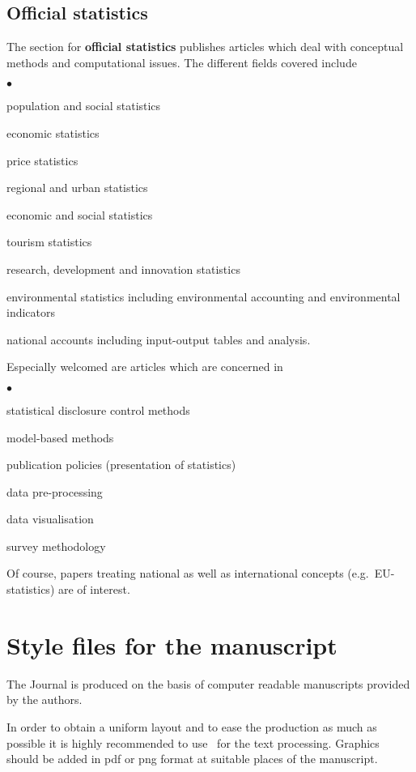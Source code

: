 \documentclass[article]{ajs}
\begin{document}
\subsection{Official statistics}

The section for {\bf official statistics} publishes articles which
deal with conceptual methods and computational issues. The
different fields covered include
\begin{list}{$\bullet$}{\setlength{\topsep}{0mm}\setlength{\itemsep}{-1mm}}
 \item population and social statistics
 \item economic statistics
 \item price statistics
 \item regional and urban statistics
 \item economic and social statistics
 \item tourism statistics
 \item research, development and innovation statistics
 \item environmental statistics including environmental accounting and
       environmental indicators
 \item national accounts including input-output tables and analysis.
\end{list}
Especially welcomed are articles which are concerned in
\begin{list}{$\bullet$}{\setlength{\topsep}{0mm}\setlength{\itemsep}{-1mm}}
 \item statistical disclosure control methods
 \item model-based methods
 \item publication policies (presentation of statistics)
 \item data pre-processing
 \item data visualisation
 \item survey methodology
\end{list}
Of course, papers treating national as well as international
concepts (e.g.~EU-statistics) are of interest.



\section{Style files for the manuscript}

The Journal is produced on the basis of computer readable
manuscripts provided by the authors. 

In order to obtain a uniform layout and to ease the production as
much as possible it is highly recommended to use \LaTeXe\ for the
text processing. Graphics should be added in pdf or png format
 at suitable places of the manuscript.
\end{document}
